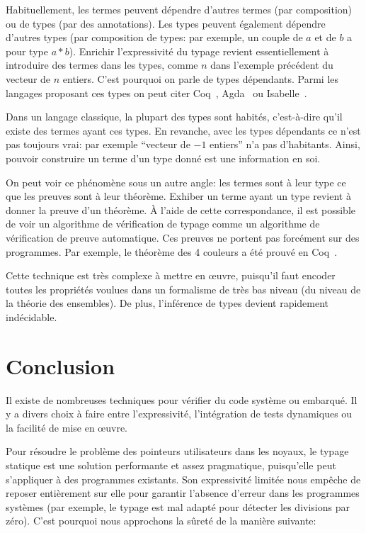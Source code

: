 Habituellement, les termes peuvent dépendre d'autres termes (par composition) ou
de types (par des annotations). Les types peuvent également dépendre d'autres
types (par composition de types: par exemple, un couple de $a$ et de $b$ a pour
type $a * b$). Enrichir l'expressivité du typage revient essentiellement à
introduire des termes dans les types, comme $n$ dans l'exemple précédent du
vecteur de $n$ entiers. C'est pourquoi on parle de types dépendants. Parmi les
langages proposant ces types on peut citer Coq~\cite{coqmanual},
Agda~\cite{agdatutorial} ou Isabelle~\cite{isabelletutorial}.

Dans un langage classique, la plupart des types sont habités, c'est-à-dire qu'il
existe des termes ayant ces types. En revanche, avec les types dépendants ce
n'est pas toujours vrai: par exemple \enquote{vecteur de $-1$ entiers} n'a pas
d'habitants. Ainsi, pouvoir construire un terme d'un type donné est une
information en soi.

On peut voir ce phénomène sous un autre angle: les termes sont à leur type ce
que les preuves sont à leur théorème. Exhiber un terme ayant un type revient à
donner la preuve d'un théorème. À l'aide de cette correspondance, il est
possible de voir un algorithme de vérification de typage comme un algorithme de
vérification de preuve automatique. Ces preuves ne portent pas forcément sur des
programmes. Par exemple, le théorème des 4 couleurs a été prouvé en
Coq~\cite{4colpap}.

Cette technique est très complexe à mettre en œuvre, puisqu'il faut encoder
toutes les propriétés voulues dans un formalisme de très bas niveau (du niveau
de la théorie des ensembles). De plus, l'inférence de types devient rapidement
indécidable.

\section*{Conclusion}

Il existe de nombreuses techniques pour vérifier du code système ou embarqué. Il
y a divers choix à faire entre l'expressivité, l'intégration de tests
dynamiques ou la facilité de mise en œuvre.

Pour résoudre le problème des pointeurs utilisateurs dans les noyaux, le typage
statique est une solution performante et assez pragmatique, puisqu'elle peut
s'appliquer à des programmes existants. Son expressivité limitée nous empêche de
reposer entièrement sur elle pour garantir l'absence d'erreur dans les
programmes systèmes (par exemple, le typage est mal adapté pour détecter les
divisions par zéro). C'est pourquoi nous approchons la sûreté de la manière
suivante:

